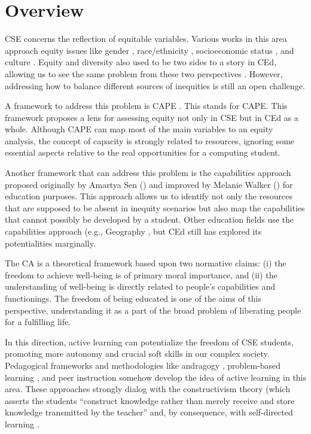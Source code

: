 \section{Overview}
\label{intro-sec:overview}

\gls{CSE} concerns the reflection of equitable variables. Various works in this area approach equity issues like gender \cite{kim:2011}, race/ethnicity \cite{nakajima:2024}, socioeconomic status \cite{parker:2018}, and culture \cite{arawjo:2021}. Equity and diversity also used to be two sides to a story in \gls{CEd}, allowing us to see the same problem from these two perspectives \cite{lewis:2019}. However, addressing how to balance different sources of inequities is still an open challenge.

A framework to address this problem is CAPE \cite{fletcher:2021}. This stands for \gls{CAPE}. This framework proposes a lens for assessing equity not only in \gls{CSE} but in \gls{CEd} as a whole. Although \gls{CAPE} can map most of the main variables to an equity analysis, the concept of capacity is strongly related to resources, ignoring some essential aspects relative to the real opportunities for a computing student.

Another framework that can address this problem is the capabilities approach proposed originally by Amartya Sen (\citeyear{sen:1992}) and improved by Melanie Walker (\citeyear{walker:2006}) for education purposes. This approach allows us to identify not only the resources that are supposed to be absent in inequity scenarios but also map the capabilities that cannot possibly be developed by a student. Other education fields use the capabilities approach (e.g., Geography \cite{walkington:2018}, but \gls{CEd} still has explored its potentialities marginally.

The \gls{CA} is a theoretical framework based upon two normative claims: (i) the freedom to achieve well-being is of primary moral importance, and (ii) the understanding of well-being is directly related to people’s capabilities and functionings. The freedom of being educated is one of the aims of this perspective, understanding it as a part of the broad problem of liberating people for a fulfilling life.

In this direction, active learning can potentialize the freedom of \gls{CSE} students, promoting more autonomy and crucial soft skills in our complex society. Pedagogical frameworks and methodologies like andragogy \cite{ellis:2002}, problem-based learning \cite{santos:2021}, and peer instruction \cite{bispojr:2021} somehow develop the idea of active learning in this area. These approaches strongly dialog with the constructivism theory (which asserts the students “construct knowledge rather than merely receive and store knowledge transmitted by the teacher” \cite[p.~45]{ben-ari:2001} and, by consequence, with self-directed learning \cite{mccartney:2016}. 

